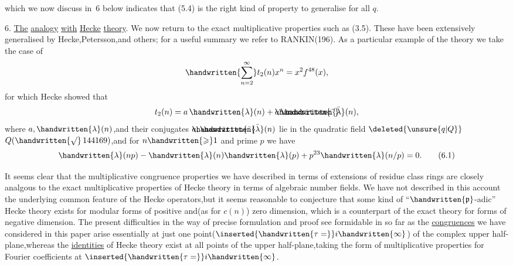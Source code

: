\noindent which we now discuss  in \handwritten{\S}\,6 below indicates that (5.4) is the right kind of property to generalise for all \uline{$q$}.

6. \uline{The} \uline{analogy} \uline{with} \uline{Hecke} \uline{theory}. We now return to the exact multiplicative properties such as (3.5). These have been extensively generalised by Hecke,Petersson,and others; for a useful summary we refer to RANKIN(196\hspace{.6em}). As a particular example of the theory we take the case of
\[
\handwritten{\sum_{n=2}^{\infty}}t_{2}(n)x^{n}=x^{2}f^{48}(x),
\]
for which Hecke showed that
\[
t_{2}(n)=a\,\handwritten{\lambda}(n)+\mathord{\rlap{$\handwritten{\bar{\phantom{a}}}$}a}\,\handwritten{\bar{\lambda}}(n),
\]
where $a,\handwritten{\lambda}(n)$,and their conjugates $\mathord{\rlap{$\handwritten{\bar{\phantom{a}}}$}a},\handwritten{\bar{\lambda}}(n)$ lie in the quadratic field $\deleted{\unsure{q|Q}}$\reversemarginpar{} $Q(\handwritten{\surd}\,144169)$,and for $n\handwritten{\geqslant}1$ and prime $p$ we have
\[
\handwritten{\lambda}(np)-\handwritten{\lambda}(n)\handwritten{\lambda}(p)+p^{23}\handwritten{\lambda}(n/p)=0.
\tag*{(6.1)}
\]

It seems clear that the multiplicative congruence properties we have described in terms of extensions of residue class rings are closely analgous to the exact multiplicative properties of Hecke theory in terms of algebraic number fields. We have not described in this account the underlying common feature of the Hecke operators,but it seems reasonable to conjecture that some kind of ``$\handwritten{\mathfrak{p}}$-adic'' Hecke theory\normalmarginpar{} exists for modular forms of positive and(as for $c(n)$) zero dimension, which is a counterpart of the exact theory for forms of negative dimension. The present difficulties in the way of precise formulation and proof see formidable in so far as the \uline{congruences} we have considered in this paper arise essentially at just one point($\inserted{\handwritten{\tau=}}i\handwritten{\infty}$) of the complex upper half-plane,whereas the \uline{identities} of Hecke theory exist at all points of the upper half-plane,taking the form of multiplicative properties for Fourier coefficients at $\inserted{\handwritten{\tau=}}i\handwritten{\infty}$.

